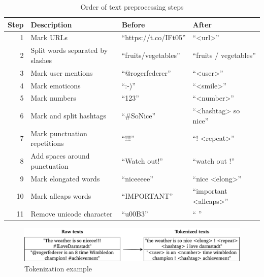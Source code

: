 \begin{table}
\begin{tabular}{rlll}
\toprule
Step & Description & Before & After \\
\midrule
1 & Mark URLs & ``https://t.co/IFt05'' & ``<url>'' \\
2 & Split words separated by slashes & ``fruits/vegetables'' & ``fruits / vegetables'' \\
3 & Mark user mentions & ``@rogerfederer'' & ``<user>'' \\
4 & Mark emoticons & ``:-)'' & ``<smile>'' \\
5 & Mark numbers & ``123'' & ``<number>'' \\
6 & Mark and split hashtags & ``\#SoNice'' & ``<hashtag> so nice'' \\
7 & Mark punctuation repetitions & ``!!!'' & ``! <repeat>'' \\
8 & Add spaces around punctuation & ``Watch out!'' & ``watch out !'' \\
9 & Mark elongated words & ``niceeeee'' & ``nice <elong>'' \\
10 & Mark allcaps words & ``IMPORTANT'' & ``important <allcaps>'' \\
11 & Remove unicode character & ``u00B3'' & `` '' \\
\bottomrule
\end{tabular}
\caption{Order of text preprocessing steps}
\label{tab:text_preprocessing}
\end{table}

\begin{figure}[h]
  \includegraphics[width=\textwidth]{img/text_preprocessing_1}
  \caption{Tokenization example}
\label{fig:tokenization}
\end{figure}


